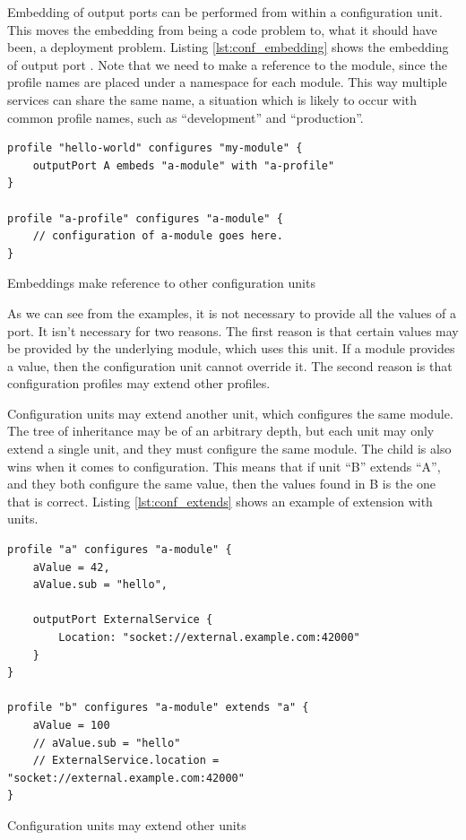 Embedding of output ports can be performed from within a configuration unit.
This moves the embedding from being a code problem to, what it should have
been, a deployment problem. Listing \ref{lst:conf_embedding} shows the
embedding of output port . Note that we need to make a
reference to the module, since the profile names are placed under a namespace
for each module. This way multiple services can share the same name, a
situation which is likely to occur with common profile names, such as
``development'' and ``production''.

\begin{listing}[H]
\begin{verbatim}
profile "hello-world" configures "my-module" {
    outputPort A embeds "a-module" with "a-profile"
}

profile "a-profile" configures "a-module" {
    // configuration of a-module goes here.
}
\end{verbatim}
\caption{Embeddings make reference to other configuration units}
\label{lst:conf_embedding}
\end{listing}

As we can see from the examples, it is not necessary to provide all the values
of a port. It isn't necessary for two reasons. The first reason is that certain
values may be provided by the underlying module, which uses this unit. If a
module provides a value, then the configuration unit cannot override it. The
second reason is that configuration profiles may extend other profiles.

Configuration units may extend another unit, which configures the same module.
The tree of inheritance may be of an arbitrary depth, but each unit may only
extend a single unit, and they must configure the same module. The child is
also wins when it comes to configuration. This means that if unit ``B'' extends
``A'', and they both configure the same value, then the values found in B is
the one that is correct. Listing \ref{lst:conf_extends} shows an example of
extension with units.

\begin{listing}[H]
\begin{verbatim}
profile "a" configures "a-module" {
    aValue = 42,
    aValue.sub = "hello",

    outputPort ExternalService {
        Location: "socket://external.example.com:42000"
    }
}

profile "b" configures "a-module" extends "a" {
    aValue = 100
    // aValue.sub = "hello"
    // ExternalService.location = "socket://external.example.com:42000"
}
\end{verbatim}
\caption{Configuration units may extend other units}
\label{lst:conf_extends}
\end{listing}

